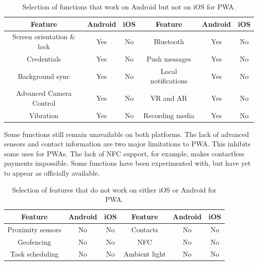 \begin{table}[ht]
    \centering
    \begin{tabular}{ |c|c|c|c|c|c| } 
        \hline
        \rowcolor{light-gray}
        Feature & Android & iOS & Feature & Android & iOS\\
        \hline
        Screen orientation \& lock & Yes & No & Bluetooth & Yes & No \\ 
        \hline
        Credentials & Yes & No & Push messages & Yes & No \\ 
        \hline
        Background sync & Yes & No & Local notifications & Yes & No \\ 
        \hline
        Advanced Camera Control & Yes & No & VR and AR & Yes & No \\
        \hline
        Vibration & Yes & No & Recording media & Yes & No\\
        \hline
    \end{tabular}
    \caption{\label{tab:yes-no-features}Selection of functions that work on Android but not on iOS for PWA.}
\end{table}


Some functions still remain unavailable on both platforms. The lack of advanced sensors and contact information are two major limitations to PWA. This inhibits some uses for PWAs. The lack of NFC support, for example, makes contactless payments impossible. Some functions have been experimented with, but have yet to appear as officially available.
\newline

\begin{table}[ht]
    \centering
    \begin{tabular}{ |c|c|c|c|c|c| } 
        \hline
        \rowcolor{light-gray}
        Feature & Android & iOS & Feature & Android & iOS\\
        \hline
        Proximity sensors & No & No & Contacts & No & No \\ 
        \hline
        Geofencing & No & No & NFC & No & No \\ 
        \hline
        Task scheduling & No & No & Ambient light & No & No \\ 
        \hline
    \end{tabular}
    \caption{\label{tab:no-feature}Selection of features that do not work on either iOS or Android for PWA.}
\end{table}

